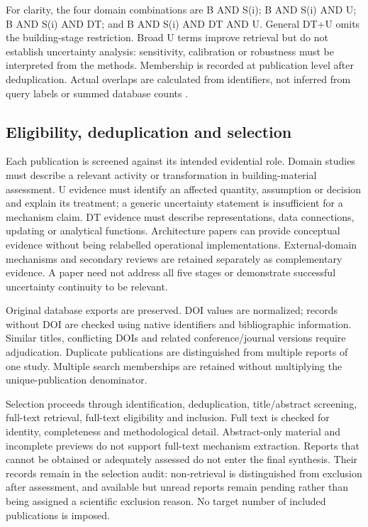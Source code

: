 For clarity, the four domain combinations are B AND S(i); B AND S(i) AND U; B AND S(i) AND DT; and B AND S(i) AND DT AND U. General DT+U omits the building-stage restriction. Broad U terms improve retrieval but do not establish uncertainty analysis: sensitivity, calibration or robustness must be interpreted from the methods. Membership is recorded at publication level after deduplication. Actual overlaps are calculated from identifiers, not inferred from query labels or summed database counts \citep{M02}.

\subsection{Eligibility, deduplication and selection}

Each publication is screened against its intended evidential role. Domain studies must describe a relevant activity or transformation in building-material assessment. U evidence must identify an affected quantity, assumption or decision and explain its treatment; a generic uncertainty statement is insufficient for a mechanism claim. DT evidence must describe representations, data connections, updating or analytical functions. Architecture papers can provide conceptual evidence without being relabelled operational implementations. External-domain mechanisms and secondary reviews are retained separately as complementary evidence. A paper need not address all five stages or demonstrate successful uncertainty continuity to be relevant.

Original database exports are preserved. DOI values are normalized; records without DOI are checked using native identifiers and bibliographic information. Similar titles, conflicting DOIs and related conference/journal versions require adjudication. Duplicate publications are distinguished from multiple reports of one study. Multiple search memberships are retained without multiplying the unique-publication denominator.

Selection proceeds through identification, deduplication, title/abstract screening, full-text retrieval, full-text eligibility and inclusion. Full text is checked for identity, completeness and methodological detail. Abstract-only material and incomplete previews do not support full-text mechanism extraction. Reports that cannot be obtained or adequately assessed do not enter the final synthesis. Their records remain in the selection audit: non-retrieval is distinguished from exclusion after assessment, and available but unread reports remain pending rather than being assigned a scientific exclusion reason. No target number of included publications is imposed.

